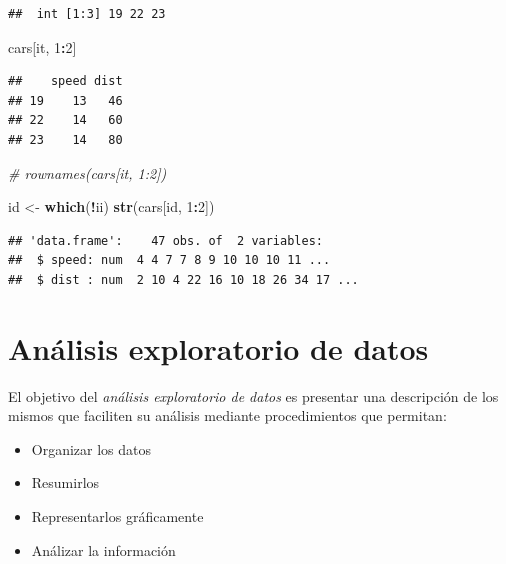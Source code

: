 \documentclass[]{book}
\newenvironment{Shaded}{\begin{snugshade}}{\end{snugshade}}
\newcommand{\CommentTok}[1]{\textcolor[rgb]{0.56,0.35,0.01}{\textit{#1}}}
\newcommand{\DecValTok}[1]{\textcolor[rgb]{0.00,0.00,0.81}{#1}}
\newcommand{\KeywordTok}[1]{\textcolor[rgb]{0.13,0.29,0.53}{\textbf{#1}}}
\newcommand{\NormalTok}[1]{#1}
\newcommand{\OperatorTok}[1]{\textcolor[rgb]{0.81,0.36,0.00}{\textbf{#1}}}
\newcommand{\StringTok}[1]{\textcolor[rgb]{0.31,0.60,0.02}{#1}}
\providecommand{\tightlist}{%
  \setlength{\itemsep}{0pt}\setlength{\parskip}{0pt}}
\begin{document}
\begin{verbatim}
##  int [1:3] 19 22 23
\end{verbatim}

\begin{Shaded}
\begin{Highlighting}[]
\NormalTok{cars[it, }\DecValTok{1}\OperatorTok{:}\DecValTok{2}\NormalTok{]}
\end{Highlighting}
\end{Shaded}

\begin{verbatim}
##    speed dist
## 19    13   46
## 22    14   60
## 23    14   80
\end{verbatim}

\begin{Shaded}
\begin{Highlighting}[]
\CommentTok{# rownames(cars[it, 1:2])}

\NormalTok{id <-}\StringTok{ }\KeywordTok{which}\NormalTok{(}\OperatorTok{!}\NormalTok{ii)}
\KeywordTok{str}\NormalTok{(cars[id, }\DecValTok{1}\OperatorTok{:}\DecValTok{2}\NormalTok{])}
\end{Highlighting}
\end{Shaded}

\begin{verbatim}
## 'data.frame':    47 obs. of  2 variables:
##  $ speed: num  4 4 7 7 8 9 10 10 10 11 ...
##  $ dist : num  2 10 4 22 16 10 18 26 34 17 ...
\end{verbatim}

\begin{Shaded}
\end{Shaded}

\hypertarget{analisis-exploratorio-de-datos}{%
\chapter{Análisis exploratorio de datos}\label{analisis-exploratorio-de-datos}}

El objetivo del \emph{análisis exploratorio de datos} es presentar una descripción de los
mismos que faciliten su análisis mediante procedimientos que permitan:

\begin{itemize}
\tightlist
\item
  Organizar los datos
\item
  Resumirlos
\item
  Representarlos gráficamente
\item
  Análizar la información
\end{itemize}
\end{document}
